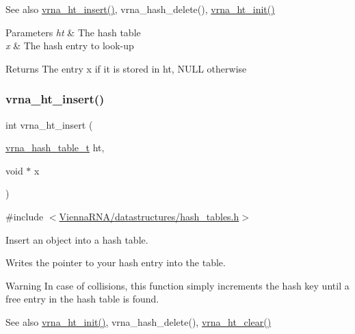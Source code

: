 \begin{DoxySeeAlso}{See also}
\hyperlink{group__hash__table__utils_ga4d2189ce8048f031a15ca5e4b290d494}{vrna\+\_\+ht\+\_\+insert()}, vrna\+\_\+hash\+\_\+delete(), \hyperlink{group__hash__table__utils_ga37d1c7e13087a2b7c1b87fda34577c29}{vrna\+\_\+ht\+\_\+init()}
\end{DoxySeeAlso}

\begin{DoxyParams}{Parameters}
{\em ht} & The hash table \\
\hline
{\em x} & The hash entry to look-\/up \\
\hline
\end{DoxyParams}
\begin{DoxyReturn}{Returns}
The entry {\ttfamily x} if it is stored in {\ttfamily ht}, {\ttfamily N\+U\+LL} otherwise 
\end{DoxyReturn}
\mbox{\label{group__hash__table__utils_ga4d2189ce8048f031a15ca5e4b290d494}} 
\subsubsection{\texorpdfstring{vrna\+\_\+ht\+\_\+insert()}{vrna\_ht\_insert()}}
{\footnotesize\ttfamily int vrna\+\_\+ht\+\_\+insert (\begin{DoxyParamCaption}\item[{\hyperlink{group__hash__table__utils_gabc7c6f41b718c8e23929e528891a89c4}{vrna\+\_\+hash\+\_\+table\+\_\+t}}]{ht,  }\item[{void $\ast$}]{x }\end{DoxyParamCaption})}



{\ttfamily \#include $<$\hyperlink{hash__tables_8h}{Vienna\+R\+N\+A/datastructures/hash\+\_\+tables.\+h}$>$}



Insert an object into a hash table. 

Writes the pointer to your hash entry into the table.

\begin{DoxyWarning}{Warning}
In case of collisions, this function simply increments the hash key until a free entry in the hash table is found.
\end{DoxyWarning}
\begin{DoxySeeAlso}{See also}
\hyperlink{group__hash__table__utils_ga37d1c7e13087a2b7c1b87fda34577c29}{vrna\+\_\+ht\+\_\+init()}, vrna\+\_\+hash\+\_\+delete(), \hyperlink{group__hash__table__utils_gab90583f8f7395e735c865ad2ebdb3c29}{vrna\+\_\+ht\+\_\+clear()}
\end{DoxySeeAlso}

